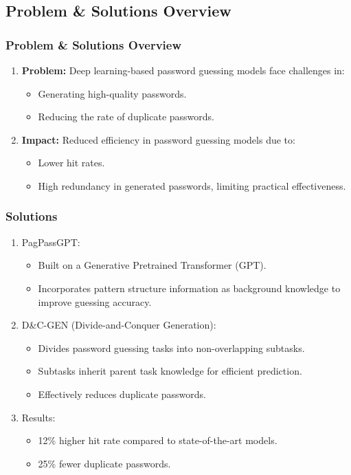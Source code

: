 \documentclass[
	12pt, %
]{beamer}
\begin{document}
\subsection{Problem \& Solutions Overview}
\begin{frame}
	\frametitle{Problem \& Solutions Overview}
	
	\begin{enumerate}
		\item \textbf{Problem:}
		Deep learning-based password guessing models face challenges in:
		\begin{itemize}
			\item Generating high-quality passwords.
			\item Reducing the rate of duplicate passwords.
		\end{itemize}
		
		\item \textbf{Impact:}
		Reduced efficiency in password guessing models due to:
		\begin{itemize}
			\item Lower hit rates.
			\item High redundancy in generated passwords, limiting practical effectiveness.
		\end{itemize}
	\end{enumerate}
\end{frame}





\begin{frame}
	\frametitle{Solutions}
	

	\begin{enumerate}
		\item PagPassGPT:
		\begin{itemize}
			\item Built on a Generative Pretrained Transformer (GPT).
			\item Incorporates pattern structure information as background knowledge to improve guessing accuracy.
		\end{itemize}
		
		\item D\&C-GEN (Divide-and-Conquer Generation):
		\begin{itemize}
			\item Divides password guessing tasks into non-overlapping subtasks.
			\item Subtasks inherit parent task knowledge for efficient prediction.
			\item Effectively reduces duplicate passwords.
		\end{itemize}
		
		\item Results:
		\begin{itemize}
			\item 12\% higher hit rate compared to state-of-the-art models.
			\item 25\% fewer duplicate passwords.
		\end{itemize}
	\end{enumerate}
\end{frame}
\end{document}
